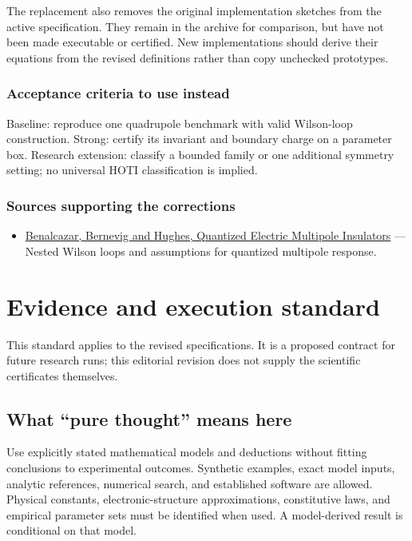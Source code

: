 \documentclass[
  11pt,
]{article}
\providecommand{\tightlist}{%
  \setlength{\itemsep}{0pt}\setlength{\parskip}{0pt}}
\begin{document}
The replacement also removes the original implementation sketches from
the active specification. They remain in the archive for comparison, but
have not been made executable or certified. New implementations should
derive their equations from the revised definitions rather than copy
unchecked prototypes.

\subsubsection{Acceptance criteria to use instead}

Baseline: reproduce one quadrupole benchmark with valid Wilson-loop
construction. Strong: certify its invariant and boundary charge on a
parameter box. Research extension: classify a bounded family or one
additional symmetry setting; no universal HOTI classification is
implied.

\subsubsection{Sources supporting the corrections}

\begin{itemize}
\tightlist
\item
  \href{https://arxiv.org/abs/1611.07987}{Benalcazar, Bernevig and
  Hughes, Quantized Electric Multipole Insulators} --- Nested Wilson
  loops and assumptions for quantized multipole response.
\end{itemize}

\section{Evidence and execution standard}

This standard applies to the revised specifications. It is a proposed
contract for future research runs; this editorial revision does not
supply the scientific certificates themselves.

\subsection{What ``pure thought'' means here}

Use explicitly stated mathematical models and deductions without fitting
conclusions to experimental outcomes. Synthetic examples, exact model
inputs, analytic references, numerical search, and established software
are allowed. Physical constants, electronic-structure approximations,
constitutive laws, and empirical parameter sets must be identified when
used. A model-derived result is conditional on that model.
\end{document}

